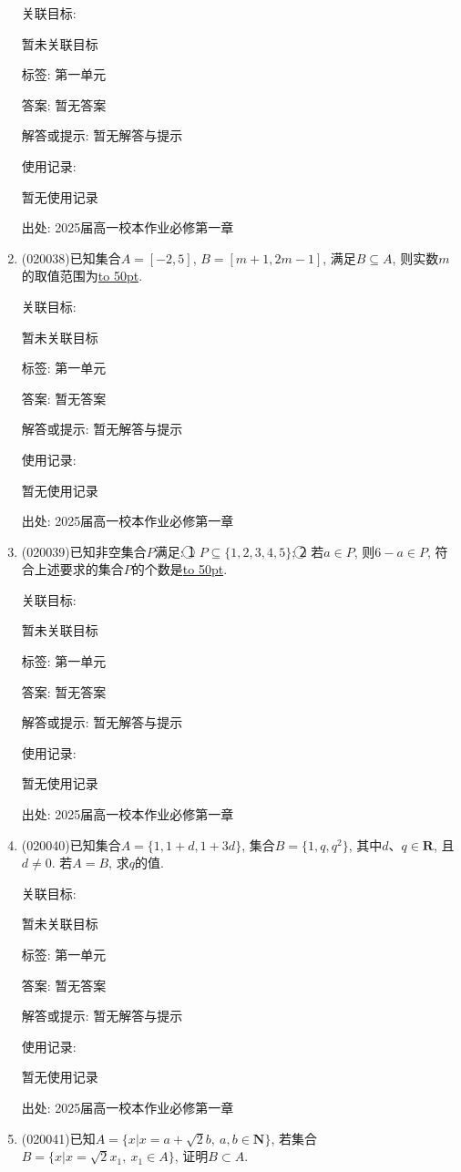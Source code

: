 \documentclass[10pt,a4paper]{article}
\newcommand{\blank}[1]{\underline{\hbox to #1pt{}}}
\begin{document}
\begin{enumerate}[1.]
关联目标:

暂未关联目标



标签: 第一单元

答案: 暂无答案

解答或提示: 暂无解答与提示

使用记录:

暂无使用记录


出处: 2025届高一校本作业必修第一章
\item { (020038)}已知集合$A=[-2,5]$, $B=[m+1,2m-1]$, 满足$B\subseteq A$, 则实数$m$的取值范围为\blank{50}.


关联目标:

暂未关联目标



标签: 第一单元

答案: 暂无答案

解答或提示: 暂无解答与提示

使用记录:

暂无使用记录


出处: 2025届高一校本作业必修第一章
\item { (020039)}已知非空集合$P$满足: \textcircled{1} $P\subseteq \{1,2,3,4,5\}$; \textcircled{2} 若$a\in P$, 则$6-a\in P$, 符合上述要求的集合$P$的个数是\blank{50}.


关联目标:

暂未关联目标



标签: 第一单元

答案: 暂无答案

解答或提示: 暂无解答与提示

使用记录:

暂无使用记录


出处: 2025届高一校本作业必修第一章
\item { (020040)}已知集合$A=\{1, 1+d, 1+3d\}$, 集合$B=\{1, q, q^2\}$, 其中$d$、$q\in \mathbf{R}$, 且$d\ne 0$. 若$A=B$, 求$q$的值.


关联目标:

暂未关联目标



标签: 第一单元

答案: 暂无答案

解答或提示: 暂无解答与提示

使用记录:

暂无使用记录


出处: 2025届高一校本作业必修第一章
\item { (020041)}已知$A=\{x|x=a+\sqrt 2b,\ a,b\in \mathbf{N}\}$, 若集合$B=\{x|x=\sqrt 2x_1,\  x_1 \in A\}$, 证明$B\subset A$.



\end{enumerate}
\end{document}
